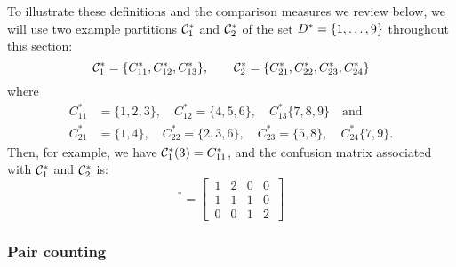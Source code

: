 To illustrate these definitions and the comparison measures we review below,
we will use two example partitions $\mathcal{C}^*_1$ and $\mathcal{C}^*_2$ of the set
$D^* = \{1,\dotsc,9\}$ throughout this section:
\begin{equation}
  \label{eq:example-parts}
  \mathcal{C}^*_1 = \{C^*_{11},C^*_{12},C^*_{13}\},\qquad
  \mathcal{C}^*_2 = \{C^*_{21},C^*_{22},C^*_{23},C^*_{24}\}
\end{equation}
where
\begin{align*}
  C^*_{11}&=\{1,2,3\},\quad C^*_{12}=\{4,5,6\},\quad C^*_{13}\{7,8,9\} \quad \text{and}\\
  C^*_{21}&=\{1,4\},\quad C^*_{22}=\{2,3,6\},\quad C^*_{23}=\{5,8\},\quad C^*_{24}\{7,9\}.
\end{align*}
Then, for example, we have $\mathcal{C}^*_1(3) = C^*_{11}$, and the confusion matrix
associated with $\mathcal{C}^*_1$ and $\mathcal{C}^*_2$ is:
\begin{equation*}
  [n_{ij}]^*=\left[\,
  \begin{matrix}
    1 & 2 & 0 & 0 \\
    1 & 1 & 1 & 0 \\
    0 & 0 & 1 & 2
  \end{matrix}
  \,\right]
\end{equation*}

\subsubsection{Pair counting}
\label{sec:pair-counting}

